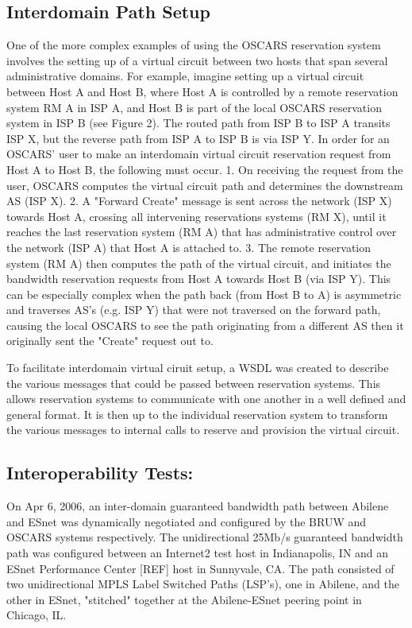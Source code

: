 \documentclass[conference]{IEEEtran}
\begin{document}
\subsection{Interdomain Path Setup }
One of the more complex examples of using the OSCARS reservation system
involves the setting up of a virtual circuit between two hosts that span
several administrative domains.  For example, imagine setting up a
virtual circuit between Host A and Host B, where Host A is controlled by a
remote reservation system RM A in ISP A, and Host B is part of the local
OSCARS reservation system in ISP B (see Figure 2). The routed path from ISP B
to ISP A transits ISP X, but the reverse path from ISP A to ISP B is via ISP Y.
In order for an OSCARS' user to make an interdomain virtual circuit reservation
request from Host A to Host B, the following must occur.
1. On receiving the request from the user, OSCARS
computes the virtual circuit path and determines the downstream AS (ISP X).
2. A "Forward Create" message is sent across the network (ISP X) towards Host
A, crossing all intervening reservations systems (RM X), until it reaches the
last reservation system (RM A) that has administrative control over the network
(ISP A) that Host A is attached to.
3. The remote reservation system (RM A) then computes the path of the virtual
circuit, and initiates the bandwidth reservation requests from Host A towards
Host B (via ISP Y).  This can be especially complex when the path back (from
Host B to A) is asymmetric and traverses AS's (e.g. ISP Y) that were not
traversed on the forward path, causing the local OSCARS to see the path
originating from a different AS then it originally sent the "Create" request
out to.

To facilitate interdomain virtual ciruit setup, a WSDL was created to describe
the various messages that could be passed between reservation systems. This
allows reservation systems to communicate with one another in a well defined
and general format. It is then up to the individual reservation system to 
transform the various messages to internal calls to reserve and provision the 
virtual circuit.

\subsection{Interoperability Tests: }

On Apr 6, 2006, an inter-domain guaranteed bandwidth path between Abilene and 
ESnet was dynamically negotiated and configured by the BRUW and OSCARS systems 
respectively. The unidirectional 25Mb/s guaranteed bandwidth path was 
configured between an Internet2 test host in Indianapolis, IN and an ESnet 
Performance Center [REF] host in Sunnyvale, CA.  The path consisted of two 
unidirectional MPLS Label Switched Paths (LSP's), one in Abilene, and the 
other in ESnet, "stitched" together at the Abilene-ESnet peering point in 
Chicago, IL.
\end{document}
